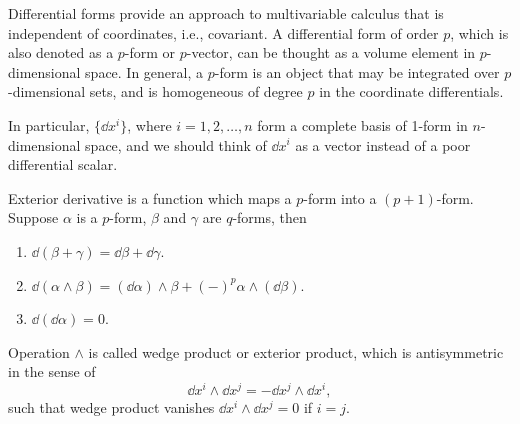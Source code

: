 \documentclass[10pt]{article}
\begin{document}
	\begin{definition}
		Differential forms provide an approach to multivariable calculus that is independent of coordinates, i.e., covariant. A differential form of order $p$, which is also denoted as a $p$-form or $p$-vector, can be thought as a volume element in $p$-dimensional space. In general, a $p$-form is an object that may be integrated over $p$-dimensional sets, and is homogeneous of degree $p$ in the coordinate differentials.

		In particular, $\{\dd x^i \}$, where $i = 1, 2, \dots, n$ form a complete basis of 1-form in $n$-dimensional space, and we should think of $\dd x^i$ as a vector instead of a poor differential scalar.
	\end{definition}

	\begin{definition}
		Exterior derivative is a function which maps a $p$-form into a $(p+1)$-form. Suppose $\alpha$ is a $p$-form, $\beta$ and $\gamma$ are $q$-forms, then
		\begin{enumerate}
			\item $\dd (\beta + \gamma) = \dd \beta + \dd \gamma$.
			\item $\dd (\alpha \wedge \beta) = (\dd \alpha) \wedge \beta + (-)^{p} \alpha \wedge (\dd \beta)$.
			\item $\dd (\dd \alpha) = 0$.
		\end{enumerate}
		Operation $\wedge$ is called wedge product or exterior product, which is antisymmetric in the sense of
		\begin{equation}
			\dd x^i \wedge \dd x^j = - \dd x^j \wedge \dd x^i,
		\end{equation}
		such that wedge product vanishes $\dd x^i \wedge \dd x^j = 0$ if $i = j$.
	\end{definition}
\end{document}
